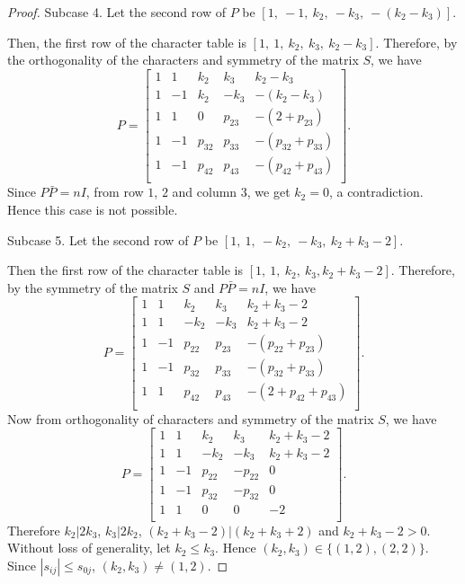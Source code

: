 \documentclass[12pt]{amsart}
\begin{document}
\begin{proof}
\medskip

Subcase 4. Let the second row of $P$ be $[1, ~ -1,~     k_2,   ~-k_3,~ -(k_2-k_3)]$.

\smallskip

Then, the first row of the character table is $[1,~ 1, ~k_2, ~k_3, ~ k_2-k_3]$.
Therefore, by the orthogonality of  the characters and symmetry of the matrix $S$, we have
$$P=\left[
   \begin{array}{ccccc}
     1 & 1 & k_2 &k_3&k_2-k_3\\
     1 & -1 &    k_2 &  -k_3&-(k_2-k_3)\\
     1 &  1 &  0&  p_{23}& -(2+ p_{23})\\
     1 & -1 &  p_{32}&  p_{33}& -(p_{32}+  p_{33})\\
     1 & -1 &  p_{42}&  p_{43}& -(p_{42}+  p_{43})\\
   \end{array}\right].
$$
Since $P\bar P=nI$, from row $1$, $2$ and column $3$, we get $k_2=0$, a contradiction. Hence this case is not possible.

\medskip

Subcase 5. Let the second row of $P$ be $[1, ~ 1,~     -k_2,   ~-k_3,~ k_2+k_3-2]$.

\smallskip

Then the first row of the character table is $[1, ~1, ~k_2, ~k_3, k_2+k_3-2]$.
Therefore, by the symmetry of the matrix $S$ and $P\bar P=nI$, we have
$$P=\left[
   \begin{array}{ccccc}
     1 & 1 & k_2 &k_3&k_2+k_3-2\\
     1 & 1 &   -k_2 &  -k_3& k_2+k_3-2\\
      1 &  -1  &  p_{22}&  p_{23}& -(p_{22}+  p_{23})\\
     1 &  -1 &  p_{32}&  p_{33}& -(p_{32}+  p_{33})\\
     1 &  1 &  p_{42}&  p_{43}& -(2 +  p_{42}+  p_{43})\\
   \end{array}\right].
$$
Now from orthogonality of characters and symmetry of the matrix $S$, we have
$$P=\left[
   \begin{array}{ccccc}
     1 & 1 & k_2 &k_3&k_2+k_3-2\\
     1 & 1 &   -k_2 &  -k_3& k_2+k_3-2\\
      1 & -1 &  p_{22}&  -p_{22}&0\\
     1 & -1 &  p_{32}&  -p_{32}& 0\\
     1 &  1 &  0&  0& -2\\
   \end{array}\right].
$$
Therefore $k_2\big|2k_3$, $k_3\big|2k_2$,  $(k_2+k_3-2)\big|(k_2+k_3+2)$ and $k_2+k_3-2>0$.
Without loss of generality, let $k_2\leq k_3$. Hence $(k_2,k_3)\in \{(1, 2),
(2, 2)\}$.
Since $|s_{ij}|\leq s_{0j}$, $(k_2,k_3)\neq (1,2)$.


\end{proof}
\end{document}
